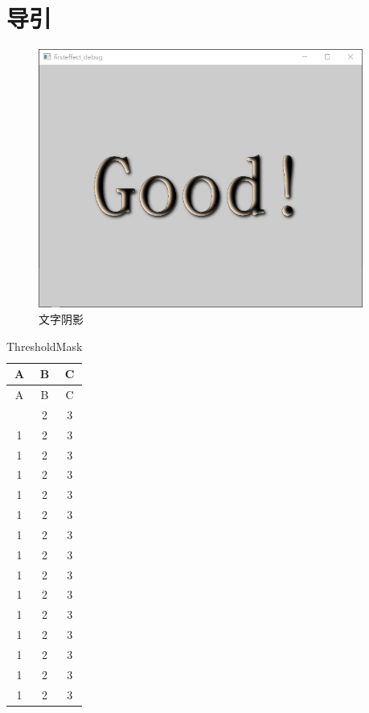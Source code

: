 ﻿




\FloatBarrier
\section{
导引
}\label{c000015s000001}


\begin{figure}[htb] %
\marginnote{\setlength\fboxsep{2pt}\fbox{\footnotesize{\kaishu\figurename\,}\footnotesize{\ref{p000012}}}}\centering %
\includegraphics[width=0.95\textwidth]{../chapter06/firsteffect/the_app.png} %
\caption{文字阴影} %
\label{p000012} %
\end{figure}


\begin{longtable}{ccc}

\toprule{}A & B & C
\\ \midrule 
\endfirsthead

\bottomrule
\caption{ThresholdMask}\label{tb000000} 
\endlastfoot

\toprule{}A & B & C
\\ \midrule
\endhead
\midrule
\endfoot 
1 & 2 & 3 \\
1 & 2 & 3 \\
1 & 2 & 3 \\
1 & 2 & 3 \\
1 & 2 & 3 \\
1 & 2 & 3 \\
1 & 2 & 3 \\
1 & 2 & 3 \\
1 & 2 & 3 \\
1 & 2 & 3 \\
1 & 2 & 3 \\
1 & 2 & 3 \\
1 & 2 & 3 \\
1 & 2 & 3 \\
1 & 2 & 3 \\
\end{longtable}











